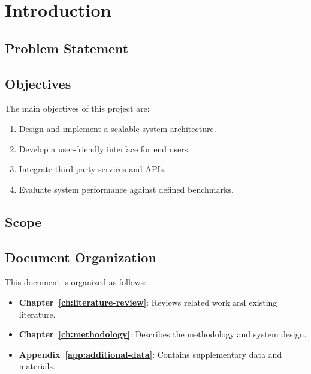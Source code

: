 \chapter{Introduction}
\label{ch:introduction}

\lipsum[6-7]



\section{Problem Statement}
\label{sec:problem-statement}

\lipsum[8]


\section{Objectives}
\label{sec:objectives}

\noindent The main objectives of this project are:

\begin{enumerate}[label=\arabic*., leftmargin=2em]
  \item Design and implement a scalable system architecture.
  \item Develop a user-friendly interface for end users.
  \item Integrate third-party services and APIs.
  \item Evaluate system performance against defined benchmarks.
\end{enumerate}

\lipsum[9]


\section{Scope}
\label{sec:scope}

\lipsum[10]


\section{Document Organization}
\label{sec:doc-organization}

\noindent This document is organized as follows:

\begin{itemize}[leftmargin=2em]
  \item \textbf{Chapter~\ref{ch:literature-review}}: Reviews related work and
        existing literature.
  \item \textbf{Chapter~\ref{ch:methodology}}: Describes the methodology and
        system design.
  \item \textbf{Appendix~\ref{app:additional-data}}: Contains supplementary
        data and materials.
\end{itemize}
